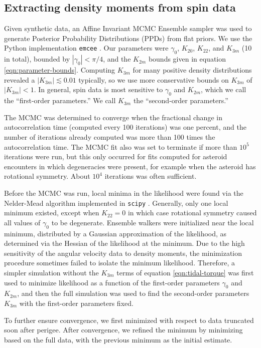 \documentclass[fleqn,usenatbib]{mnras}
\begin{document}
\subsection{Extracting density moments from spin data}
\label{sec:fit}
Given synthetic data, an Affine Invariant MCMC Ensemble sampler was used to generate Posterior Probability Distributions (PPDs) from flat priors. We use the Python implementation \texttt{emcee} \citep{foreman2013emcee}. Our parameters were $\gamma_0$, $K_{20}$, $K_{22}$, and $K_{3m}$ (10 in total), bounded by $|\gamma_0| < \pi/4$, and the $K_{2 m}$ bounds given in equation \ref{eqn:parameter-bounds}. Computing $K_{3m}$ for many positive density distributions revealed a $|K_{3m}| \lesssim 0.01$ typically, so we use more conservative bounds on $K_{3 m}$ of $|K_{3 m}| < 1$. In general, spin data is most sensitive to $\gamma_0$ and $K_{2m}$, which we call the ``first-order parameters.'' We call $K_{3m}$ the ``second-order parameters.''

The MCMC was determined to converge when the fractional change in autocorrelation time (computed every 100 iterations) was one percent, and the number of iterations already computed was more than 100 times the autocorrelation time. The MCMC fit also was set to terminate if more than $10^5$ iterations were run, but this only occurred for fits computed for asteroid encounters in which degeneracies were present, for example when the asteroid has rotational symmetry. About $10^4$ iterations was often sufficient.

Before the MCMC was run, local minima in the likelihood were found via the Nelder-Mead algorithm implemented in \texttt{scipy} \citep{Gao2012}. Generally, only one local minimum existed, except when $K_{22}=0$ in which case rotational symmetry caused all values of $\gamma_0$ to be degenerate. Ensemble walkers were initialized near the local minimum, distributed by a Gaussian approximation of the likelihood, as determined via the Hessian of the likelihood at the minimum. Due to the high sensitivity of the angular velocity data to density moments, the minimization procedure sometimes failed to isolate the minimum likelihood. Therefore, a simpler simulation without the $K_{3m}$ terms of equation \ref{eqn:tidal-torque} was first used to minimize likelihood as a function of the first-order parameters $\gamma_0$ and $K_{2m}$, and then the full simulation was used to find the second-order parameters $K_{3m}$ with the first-order parameters fixed.

To further ensure convergence, we first minimized with respect to data truncated soon after perigee. After convergence, we refined the minimum by minimizing based on the full data, with the previous minimum as the initial estimate.
\end{document}
